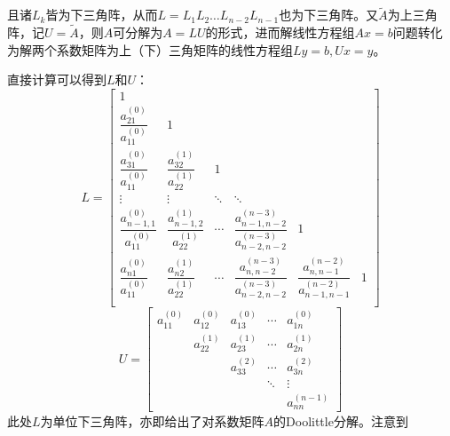 \documentclass[UTF8,a4paper,10pt]{ctexart}
\begin{document}
                且诸$L_k$皆为下三角阵，从而$L=L_1L_2\dots L_{n-2}L_{n-1}$也为下三角阵。又$\tilde{A}$为上三角阵，记$U=\tilde{A}$，则$A$可分解为$A=LU$的形式，进而解线性方程组$Ax=b$问题转化为解两个系数矩阵为上（下）三角矩阵的线性方程组$Ly=b,Ux=y$。
                \par
                直接计算可以得到$L$和$U$：
                $$
                L=
                    \begin{bmatrix}
                        1 & \  & \  & \  & \  & \  \\
                        \dfrac{a_{21}^{(0)}}{a_{11}^{(0)}} & 1 & \  & \  & \  & \  \\
                        \dfrac{a_{31}^{(0)}}{a_{11}^{(0)}} & \dfrac{a_{32}^{(1)}}{a_{22}^{(1)}} & 1 & \  & \  & \  \\
                        \vdots & \vdots & \ddots  & \ddots & \ \\
                        \dfrac{a_{n-1,1}^{(0)}}{a_{11}^{(0)}} & \dfrac{a_{n-1,2}^{(1)}}{a_{22}^{(1)}} & \cdots & \dfrac{a_{n-1,n-2}^{(n-3)}}{a_{n-2,n-2}^{(n-3)}} & 1 \\
                        \dfrac{a_{n1}^{(0)}}{a_{11}^{(0)}} & \dfrac{a_{n2}^{(1)}}{a_{22}^{(1)}} & \cdots & \dfrac{a_{n,n-2}^{(n-3)}}{a_{n-2,n-2}^{(n-3)}} & \dfrac{a_{n,n-1}^{(n-2)}}{a_{n-1,n-1}^{(n-2)}} & 1 \\
                    \end{bmatrix}
                $$
                $$
                U=
                    \begin{bmatrix}
                        a_{11}^{(0)} & a_{12}^{(0)} & a_{13}^{(0)} & \cdots & a_{1n}^{(0)} \\
                        \ & a_{22}^{(1)} & a_{23}^{(1)} & \cdots & a_{2n}^{(1)} \\
                        \ & \ & a_{33}^{(2)} & \cdots & a_{3n}^{(2)} \\
                        \ & \ & \ & \ddots & \vdots \\
                        \ & \ & \ & \ & a_{nn}^{(n-1)}
                    \end{bmatrix}
                $$
                此处$L$为单位下三角阵，亦即给出了对系数矩阵$A$的Doolittle分解。注意到
\end{document}
